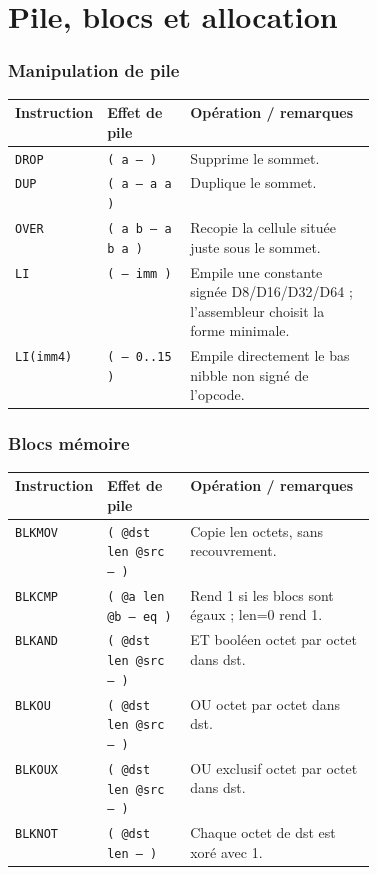 \documentclass[10pt,a4paper,twoside,openany]{book}
\renewcommand{\arraystretch}{1.12}
\begin{document}
\chapter{Pile, blocs et allocation}
\subsection{Manipulation de pile}
\begin{center}
\renewcommand{\arraystretch}{1.16}
\begin{tabularx}{\linewidth}{@{}p{0.19\linewidth} p{0.23\linewidth} X@{}}
\toprule \textbf{Instruction} & \textbf{Effet de pile} & \textbf{Opération / remarques}\\ \midrule
\texttt{DROP} & \texttt{( a -- )} & Supprime le sommet.\\
\texttt{DUP} & \texttt{( a -- a a )} & Duplique le sommet.\\
\texttt{OVER} & \texttt{( a b -- a b a )} & Recopie la cellule située juste sous le sommet.\\
\texttt{LI} & \texttt{( -- imm )} & Empile une constante signée D8/D16/D32/D64 ; l'assembleur choisit la forme minimale.\\
\texttt{LI(imm4)} & \texttt{( -- 0..15 )} & Empile directement le bas nibble non signé de l'opcode.\\
\bottomrule
\end{tabularx}
\end{center}
\subsection{Blocs mémoire}
\begin{center}
\renewcommand{\arraystretch}{1.16}
\begin{tabularx}{\linewidth}{@{}p{0.19\linewidth} p{0.23\linewidth} X@{}}
\toprule \textbf{Instruction} & \textbf{Effet de pile} & \textbf{Opération / remarques}\\ \midrule
\texttt{BLKMOV} & \texttt{( @dst len @src -- )} & Copie len octets, sans recouvrement.\\
\texttt{BLKCMP} & \texttt{( @a len @b -- eq )} & Rend 1 si les blocs sont égaux ; len=0 rend 1.\\
\texttt{BLKAND} & \texttt{( @dst len @src -- )} & ET booléen octet par octet dans dst.\\
\texttt{BLKOU} & \texttt{( @dst len @src -- )} & OU octet par octet dans dst.\\
\texttt{BLKOUX} & \texttt{( @dst len @src -- )} & OU exclusif octet par octet dans dst.\\
\texttt{BLKNOT} & \texttt{( @dst len -- )} & Chaque octet de dst est xoré avec 1.\\
\bottomrule
\end{tabularx}
\end{center}
\end{document}
